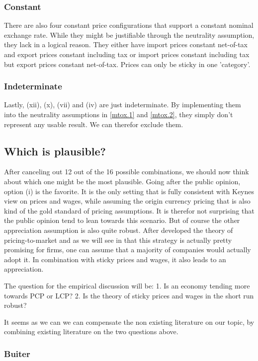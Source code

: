 \subsubsection{Constant}
There are also four constant price configurations that support a constant nominal exchange rate. While they might be justifiable through the neutrality assumption, they lack in a logical reason. They either have import prices constant net-of-tax and export prices constant including tax or import prices constant including tax but export prices constant net-of-tax. Prices can only be sticky in one 'category'. 

\subsubsection{Indeterminate }
Lastly, (xii), (x), (vii) and (iv) are just indeterminate. By implementing them into the neutrality assumptions in \eqref{mtox.1} and  \eqref{mtox.2}, they simply don't represent any usable result. We can therefor exclude them.

\subsection{Which is plausible?}
After canceling out 12 out of the 16 possible combinations, we should now think about which one might be the most plausible. Going after the public opinion, option (i) is the favorite. It is the only setting that is fully consistent with Keynes view on prices and wages, while assuming the origin currency pricing that is also kind of the gold standard of pricing assumptions. It is therefor not surprising that the public opinion tend to lean towards this scenario. But of course the other appreciation assumption is also quite robust. After \cite{krugman1986pricing} developed the theory of pricing-to-market and as we will see in \cite{fendel2008local} that this strategy is actually pretty promising for firms, one can assume that a majority of companies would actually adopt it. In combination with sticky prices and wages, it also leads to an appreciation.

The question for the empirical discussion will be: 
1. Is an economy tending more towards PCP or LCP?
2. Is the theory of sticky prices and wages in the short run robust?

It seems as we can we can compensate the non existing literature on our topic, by combining existing literature on the two questions above. 
\subsubsection{Buiter}

